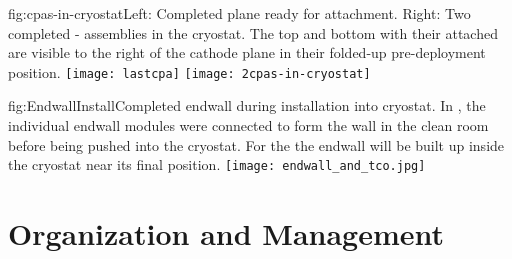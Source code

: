 
\begin{dunefigure}{fig:cpas-in-cryostat}{Left: Completed   plane ready for  attachment. Right: Two completed - assemblies in the  cryostat. The top and bottom  with their  attached are visible to the right of the cathode plane in their folded-up pre-deployment position.}
\texttt{[image: lastcpa]}
\texttt{[image: 2cpas-in-cryostat]}
\end{dunefigure}

\begin{dunefigure}{fig:EndwallInstall}{Completed endwall %
during installation into  cryostat. In %
, the individual endwall modules were connected to form the wall in the clean room before being pushed into the cryostat. %
For the  the endwall will be built up inside the cryostat near its final position.}
\texttt{[image: endwall\_and\_tco.jpg]}
\end{dunefigure}


\clearpage
\section{Organization and Management}
\label{sec:fdsp-hv-org}


